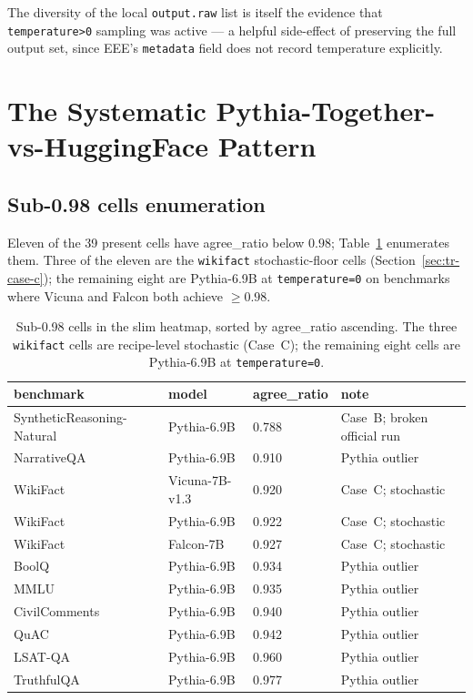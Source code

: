 \documentclass[11pt]{article}
\begin{document}
The diversity of the local \texttt{output.raw} list is itself the
  evidence that \texttt{temperature>0} sampling was active --- a
  helpful side-effect of preserving the full output set, since EEE's
  \texttt{metadata} field does not record temperature explicitly.


\section{The Systematic Pythia-Together-vs-HuggingFace Pattern}
\label{sec:tr-pythia-pattern}

\subsection{Sub-0.98 cells enumeration}
\label{sec:tr-pythia-sub98}

Eleven of the 39 present cells have agree\_ratio below $0.98$;
  Table~\ref{tab:tr-sub98} enumerates them.
Three of the eleven are the \texttt{wikifact} stochastic-floor cells
  (Section~\ref{sec:tr-case-c}); the remaining eight are
  Pythia-6.9B at \texttt{temperature=0} on benchmarks where Vicuna
  and Falcon both achieve $\geq 0.98$.

\begin{table}[htbp]
\centering
\small
\caption{Sub-0.98 cells in the slim heatmap, sorted by
  agree\_ratio ascending.
The three \texttt{wikifact} cells are recipe-level stochastic
  (Case~C); the remaining eight cells are Pythia-6.9B at
  \texttt{temperature=0}.}
\label{tab:tr-sub98}
\begin{tabular}{llll}
\toprule
benchmark & model & agree\_ratio & note \\
\midrule
SyntheticReasoning-Natural & Pythia-6.9B           & 0.788 & Case~B; broken official run \\
NarrativeQA                & Pythia-6.9B           & 0.910 & Pythia outlier \\
WikiFact                   & Vicuna-7B-v1.3        & 0.920 & Case~C; stochastic \\
WikiFact                   & Pythia-6.9B           & 0.922 & Case~C; stochastic \\
WikiFact                   & Falcon-7B             & 0.927 & Case~C; stochastic \\
BoolQ                      & Pythia-6.9B           & 0.934 & Pythia outlier \\
MMLU                       & Pythia-6.9B           & 0.935 & Pythia outlier \\
CivilComments              & Pythia-6.9B           & 0.940 & Pythia outlier \\
QuAC                       & Pythia-6.9B           & 0.942 & Pythia outlier \\
LSAT-QA                    & Pythia-6.9B           & 0.960 & Pythia outlier \\
TruthfulQA                 & Pythia-6.9B           & 0.977 & Pythia outlier \\
\bottomrule
\end{tabular}
\end{table}
\end{document}
